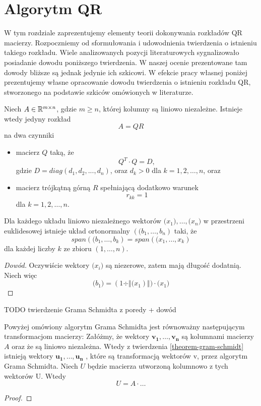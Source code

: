 \documentclass[10pt,a4paper]{report}
\newcommand{\vr}[1]{\mathbf{#1}}
\newcommand{\mx}[1]{{#1}}
\begin{document}
\chapter{Algorytm QR}

W tym rozdziale zaprezentujemy elementy teorii dokonywania rozkładów QR macierzy. Rozpoczniemy od sformułowania i udowodnienia twierdzenia o istnieniu takiego rozkładu. Wiele analizowanych pozycji literaturowych sygnalizowało posiadanie dowodu poniższego twierdzenia. W naszej ocenie prezentowane tam dowody bliższe są jednak jedynie ich szkicowi. W efekcie pracy własnej poniżej prezentujemy własne opracowanie dowodu twierdzenia o istnieniu rozkładu QR, stworzonego na podstawie szkiców omówionych w literaturze. 

\begin{theorem}[O rozkładzie QR]\label{theorem-qr-docomposition}
Niech $\mx{A} \in \setR^{m \times n}$, gdzie $m\ge n$, której kolumny są liniowo niezależne. Istnieje wtedy jedyny rozkład 
$$
\mx{A} = \mx{Q} \mx{R}
$$ 
na dwa czynniki
\begin{itemize}
\item macierz $\mx{Q}$ taką, że 
$$
Q^{T}\cdot Q=D,
$$
gdzie $D= diag (d_{1}, d_{2}, ..., d_{n})$, oraz $d_{k}>0$ dla $k = 1, 2, \ldots, n$, oraz
\item macierz trójkątną górną $\mx{R}$ spełniającą dodatkowo warunek 
$$
r_{kk}= 1 
$$ 
dla $k = 1, 2, \ldots, n$.
\end{itemize} 
\end{theorem}

\begin{theorem}
Dla każdego układu liniowo niezależnego wektorów $\vr(x_{1}),\ldots,\vr(x_{n})$ w przestrzeni euklidesowej istnieje układ ortonormalny $(\vr(b_{1},\ldots,b_{n})$ taki, że 
$$
span(\vr(b_{1},\ldots,b_{k}) = span(\vr(x_{1},\ldots,x_{k})
$$
dla każdej liczby $k$ ze zbioru $(1,\ldots,n)$.
\end{theorem}

\begin{proof}[Dowód\citep{poreda11}]
Oczywiście wektory $\vr(x_{i})$ są niezerowe, zatem mają długość dodatnią. Niech więc
$$
\vr(b_{1})=(1\div\Vert\vr(x_{1})\Vert)\cdot\vr(x_{1})
$$

\end{proof}
TODO twierdzenie Grama Schmidta z poredy + dowód

\begin{lemma}
Powyżej omówiony algorytm Grama Schmidta jest równoważny następującym transformacjom macierzy: Załóżmy, że wektory $\vr{v_1}, \ldots, \vr{v_n}$ są kolumnami macierzy $\mx{A}$ oraz że są liniowo niezależna. Wtedy z twierdzenia \ref{theorem-gram-schmidt} istnieją wektory $\vr{u_1}, \ldots, \vr{u_n}$ , które są transformacją wektorów v, przez algorytm Grama Schmidta. Niech $\mx{U}$ będzie macierza utworzoną kolumnowo z tych wektorów U. Wtedy
$$
U = A \cdot \ldots
$$
\end{lemma}
\begin{proof}

\end{proof}
\end{document}
